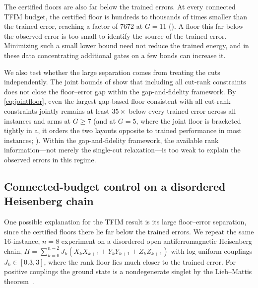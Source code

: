 \documentclass[reprint,aps,pra,floatfix,superscriptaddress,nofootinbib,longbibliography]{revtex4-2}
\theoremstyle{remark}
\theoremstyle{definition}
\begin{document}
The certified floors are also far below the trained errors. At every connected
TFIM budget, the certified floor is hundreds to thousands of times smaller than
the trained error, reaching a factor of $7672$ at $G=11$ (). A
floor this far below the observed error is too small to identify the source of
the trained error. Minimizing such a small lower bound need not reduce the
trained energy, and in these data concentrating additional gates on a few bonds
can increase it.

We also test whether the large separation comes from treating the cuts
independently. The joint bounds of  show that including all
cut-rank constraints does not close the floor--error gap within the
gap-and-fidelity framework. By \eqref{eq:jointfloor}, even
the largest gap-based floor consistent with all cut-rank constraints jointly
remains at least $35\times$ below every trained error across all instances and
arms at $G\ge7$ (and at $G=5$, where the joint floor is bracketed tightly in
a, it orders the two layouts opposite to trained performance in
most instances; ). Within the gap-and-fidelity framework, the available rank information---not
merely the single-cut relaxation---is too weak to explain the observed errors in
this regime.

\subsection{Connected-budget control on a disordered Heisenberg chain}
\label{sec:heisenberg}

One possible explanation for the TFIM result is its large floor--error
separation, since the certified floors there lie far below the trained errors. We repeat the same $16$-instance, $n=8$ experiment on a disordered open
antiferromagnetic Heisenberg chain,
$H=\sum_{k=0}^{n-2}J_k(X_kX_{k+1}+Y_kY_{k+1}+Z_kZ_{k+1})$ with log-uniform
couplings $J_k\in[0.3,3]$, where the rank floor lies much closer to the trained
error. For positive couplings the ground state is a nondegenerate singlet by the
Lieb--Mattis theorem~\cite{lieb1962ordering}.
\end{document}
